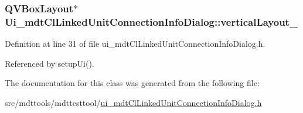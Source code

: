 \hypertarget{class_ui__mdt_cl_linked_unit_connection_info_dialog_a5d4655d9df3b47d707383addb263ad93}{
\subsubsection[{vertical\-Layout\-\_\-3}]{\setlength{\rightskip}{0pt plus 5cm}Q\-V\-Box\-Layout$\ast$ Ui\-\_\-mdt\-Cl\-Linked\-Unit\-Connection\-Info\-Dialog\-::vertical\-Layout\-\_}}\label{class_ui__mdt_cl_linked_unit_connection_info_dialog_a5d4655d9df3b47d707383addb263ad93}


Definition at line 31 of file ui\-\_\-mdt\-Cl\-Linked\-Unit\-Connection\-Info\-Dialog.\-h.



Referenced by setup\-Ui().



The documentation for this class was generated from the following file\-:\begin{DoxyCompactItemize}
\item 
src/mdttools/mdttesttool/\hyperlink{ui__mdt_cl_linked_unit_connection_info_dialog_8h}{ui\-\_\-mdt\-Cl\-Linked\-Unit\-Connection\-Info\-Dialog.\-h}\end{DoxyCompactItemize}
